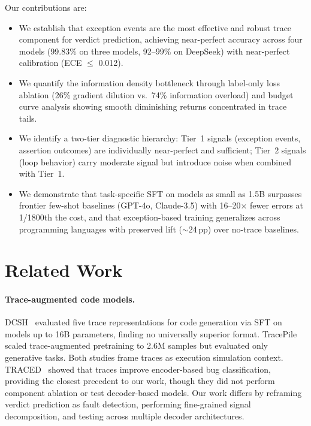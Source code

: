 \documentclass[11pt,a4paper]{article}
\newcommand{\pp}{\,pp}
\begin{document}
Our contributions are:
\begin{itemize}
    \item We establish that exception events are the most effective and robust trace component for verdict prediction, achieving near-perfect accuracy across four models (99.83\% on three models, 92--99\% on DeepSeek) with near-perfect calibration (ECE $\leq$ 0.012).
    \item We quantify the information density bottleneck through label-only loss ablation (26\% gradient dilution vs.\ 74\% information overload) and budget curve analysis showing smooth diminishing returns concentrated in trace tails.
    \item We identify a two-tier diagnostic hierarchy: Tier~1 signals (exception events, assertion outcomes) are individually near-perfect and sufficient; Tier~2 signals (loop behavior) carry moderate signal but introduce noise when combined with Tier~1.
    \item We demonstrate that task-specific SFT on models as small as 1.5B surpasses frontier few-shot baselines (GPT-4o, Claude-3.5) with 16--20$\times$ fewer errors at 1/1800th the cost, and that exception-based training generalizes across programming languages with preserved lift ($\sim$24\pp) over no-trace baselines.
\end{itemize}

\section{Related Work}
\label{sec:related}

\paragraph{Trace-augmented code models.}
DCSH~\cite{dcsh2025} evaluated five trace representations for code generation via SFT on models up to 16B parameters, finding no universally superior format. TracePile~\cite{tracepile2025} scaled trace-augmented pretraining to 2.6M samples but evaluated only generative tasks. Both studies frame traces as execution simulation context. TRACED~\cite{traced2024} showed that traces improve encoder-based bug classification, providing the closest precedent to our work, though they did not perform component ablation or test decoder-based models. Our work differs by reframing verdict prediction as fault detection, performing fine-grained signal decomposition, and testing across multiple decoder architectures.
\end{document}
